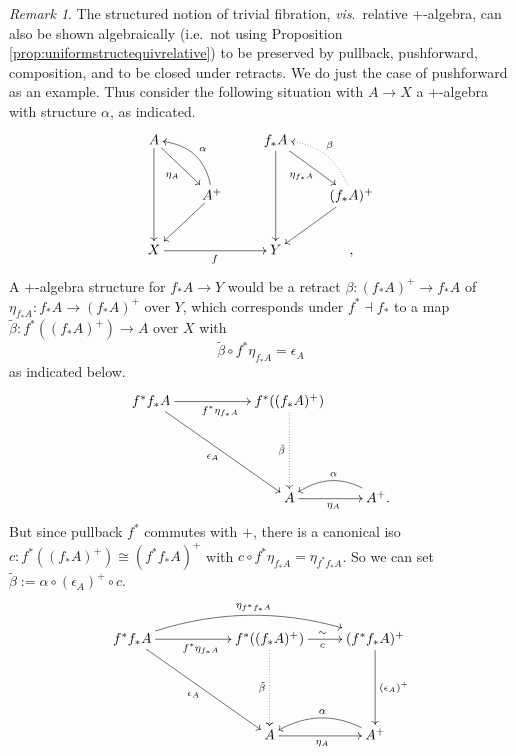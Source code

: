 \documentclass[12pt]{article}
\renewcommand{\to}{\ensuremath{\rightarrow}}
\theoremstyle{remark}
\newtheorem{remark}[theorem]{Remark}
\theoremstyle{definition}
\begin{document}
\begin{remark}\label{trivfibpushforward}
The structured notion of trivial fibration, \emph{vis}.\ relative +-algebra, can also be shown algebraically (i.e.\ not using Proposition \ref{prop:uniformstructequivrelative}) to be preserved by pullback, pushforward, composition, and to be closed under retracts. We do just the case of pushforward as an example.   
Thus consider the following situation with $A\to X$ a +-algebra with structure $\alpha$, as indicated.
\begin{equation}\label{diagram:pushforwardplusalgebras}
\xymatrix{
A \ar[rd]_{\eta_A} \ar[dd]  && f_*A \ar[rd]_{\eta_{f_*A}} \ar[dd] & \\
& A^+ \ar[ld] \ar@/_3ex/ [ul]_\alpha && (f_*A)^+ \ar[ld]  \ar@{.>}@/_3ex/ [ul]_\beta \\
X \ar[rr]_{f} && Y &,
}
\end{equation}
A +-algebra structure for $f_*A \to Y$ would be a retract $\beta : (f_*A)^+ \to f_*A$ of $\eta_{f_*A} : f_*A \to (f_*A)^+$ over $Y$, which corresponds under $f^*\dashv f_*$ to a map $\tilde\beta : f^*((f_*A)^+) \to A$ over $X$ with $$\tilde\beta \circ f^*\eta_{f_*A} = \epsilon_A$$
as indicated below.
\begin{equation}\label{diagram:pushforwardplusalgebras2}
\xymatrix{
f^*f_*A \ar[rrdd]_{\epsilon_A} \ar[rr]_{f^*\eta_{f_*A}} 
	&&  f^*((f_*A)^+)  \ar@{.>}[dd]_{\tilde\beta} \\
&&\\
&& A \ar[r]_{\eta_A} & \ar@/_3ex/ [l]_\alpha A^+ .
}
\end{equation}
But since pullback $f^*$ commutes with $+$, there is a canonical iso $c : f^*((f_*A)^+)  \cong (f^*f_*A)^+$ with $ c\circ f^*\eta_{f_*A} = \eta_{f^*f_*A} $. So we can set $\tilde\beta := \alpha\circ(\epsilon_A)^+\circ c$.
\begin{equation}\label{diagram:pushforwardplusalgebras3}
\xymatrix{
f^*f_*A \ar[rrdd]_{\epsilon_A} \ar[rr]_{f^*\eta_{f_*A}}  \ar@/^4ex/ [rrr]^{\eta_{f^*f_*A}} 
	&&  f^*((f_*A)^+)  \ar@{.>}[dd]_{\tilde\beta} \ar[r]^{\sim}_{c}  & (f^*f_*A)^+  \ar[dd]^{(\epsilon_A)^+} \\
&&&\\
&& A \ar[r]_{\eta_{A}} & \ar@/_3ex/ [l]_\alpha A^+ 
}
\end{equation}
\end{remark}
\end{document}
